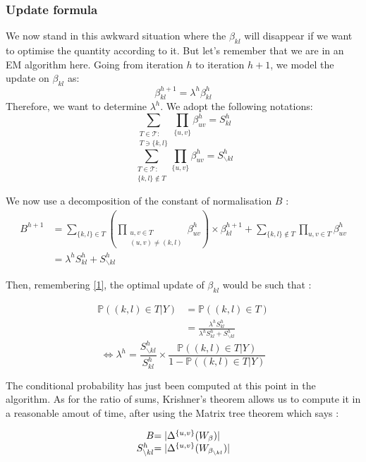 \documentclass[a4paper,10pt]{article}
\begin{document}
\subsubsection{Update formula}
 We now stand in this awkward situation where the $\beta_{kl}$ will disappear if we want to optimise the quantity according to it. But let's 
 remember that we are in an EM algorithm here. Going from iteration $h$ to iteration $h+1$, we model the update on $\beta_{kl}$ as:
 \[\beta_{kl}^{h+1} = \lambda^h \beta_{kl}^h\]
Therefore, we want to determine $\lambda^h$. We adopt the following notations:
\[ \sum_{\substack{T\in \mathcal{T}:\\T \ni \{k,l\}}} \prod_{\{u,v\}} \beta_{uv}^h= S_{kl}^h\]
\[ \sum_{\substack{T\in \mathcal{T}:\\\{k,l\} \notin T }} \prod_{\{u,v\}} \beta_{uv}^h= S_{\backslash kl}^h\]

We now use a decomposition of the constant of normalisation $B$ :
\begin{align*}
B^{h+1}  &=\sum_{\{k,l\} \in T } \left(\prod_{\substack{u,v\in T\\ (u,v) \neq (k,l)}} \beta_{uv}^{h}\right) \times\beta_{kl}^{h+1} +\sum_{\{k,l\} \notin T }
 \prod_{u,v\in T} \beta_{uv}^{h}\\
 &=\lambda^h S_{kl}^h + S_{\backslash kl}^{h}
\end{align*}

Then, remembering \ref{1}, the optimal update of $\beta_{kl}$ would be such that :

\begin{align*}
 \mathds{P}((k,l)\in T | Y)&=\mathds{P}((k,l)\in T)\\
 &=\frac{\lambda^h S_{kl}^h}{\lambda^h S_{kl}^h+S_{\backslash kl}^{h}}
\end{align*}
\[\Leftrightarrow \lambda^h = \frac{S_{\backslash kl}^{h}}{S_{kl}^h}\times\frac{\mathds{P}((k,l)\in T | Y) }{1-\mathds{P}((k,l)\in T | Y)}\]

The conditional probability has just been computed at this point in the algorithm. As for the ratio of sums, Krishner's theorem allows us
to compute it in a reasonable amout of time, after using the Matrix tree theorem which says :


\begin{align*}
  \begin{array}{r@{}l}
    B & =|\Delta^{\{u,v\}}(W_{\beta})| \\
    S_{\backslash kl}^{h}& =|\Delta^{\{u,v\}}(W_{\beta_{\backslash kl}})|
  \end{array}
 \end{align*}
 
\end{document}
